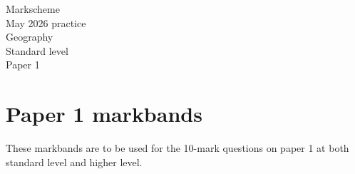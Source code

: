 \documentclass[11pt,a4paper]{article}
\begin{document}
\thispagestyle{empty}
\begin{center}
{\Large Markscheme}\\[0.35em]
May 2026 practice\\[0.35em]
Geography\\[0.35em]
Standard level\\[0.35em]
Paper 1
\end{center}

\vspace{2em}

\section*{Paper 1 markbands}

These markbands are to be used for the 10-mark questions on paper 1 at both
standard level and higher level.
\end{document}
